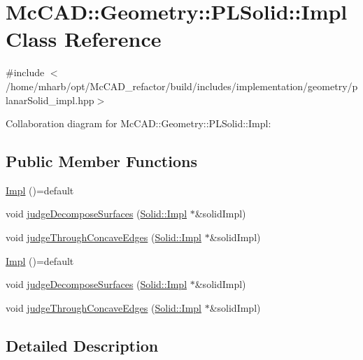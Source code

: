 \hypertarget{classMcCAD_1_1Geometry_1_1PLSolid_1_1Impl}{}\section{Mc\+C\+AD\+:\+:Geometry\+:\+:P\+L\+Solid\+:\+:Impl Class Reference}
\label{classMcCAD_1_1Geometry_1_1PLSolid_1_1Impl}


{\ttfamily \#include $<$/home/mharb/opt/\+Mc\+C\+A\+D\+\_\+refactor/build/includes/implementation/geometry/planar\+Solid\+\_\+impl.\+hpp$>$}



Collaboration diagram for Mc\+C\+AD\+:\+:Geometry\+:\+:P\+L\+Solid\+:\+:Impl\+:
\subsection*{Public Member Functions}
\begin{DoxyCompactItemize}
\item 
\hyperlink{classMcCAD_1_1Geometry_1_1PLSolid_1_1Impl_a0c9b004bfd715f51032420323b3bc925}{Impl} ()=default
\item 
void \hyperlink{classMcCAD_1_1Geometry_1_1PLSolid_1_1Impl_ad828d9d5a2eb74f867b22f779a9d2a14}{judge\+Decompose\+Surfaces} (\hyperlink{classMcCAD_1_1Geometry_1_1Solid_1_1Impl}{Solid\+::\+Impl} $\ast$\&solid\+Impl)
\item 
void \hyperlink{classMcCAD_1_1Geometry_1_1PLSolid_1_1Impl_ae5417ef1064dfe04a3eac50198626860}{judge\+Through\+Concave\+Edges} (\hyperlink{classMcCAD_1_1Geometry_1_1Solid_1_1Impl}{Solid\+::\+Impl} $\ast$\&solid\+Impl)
\item 
\hyperlink{classMcCAD_1_1Geometry_1_1PLSolid_1_1Impl_a0c9b004bfd715f51032420323b3bc925}{Impl} ()=default
\item 
void \hyperlink{classMcCAD_1_1Geometry_1_1PLSolid_1_1Impl_ad828d9d5a2eb74f867b22f779a9d2a14}{judge\+Decompose\+Surfaces} (\hyperlink{classMcCAD_1_1Geometry_1_1Solid_1_1Impl}{Solid\+::\+Impl} $\ast$\&solid\+Impl)
\item 
void \hyperlink{classMcCAD_1_1Geometry_1_1PLSolid_1_1Impl_ae5417ef1064dfe04a3eac50198626860}{judge\+Through\+Concave\+Edges} (\hyperlink{classMcCAD_1_1Geometry_1_1Solid_1_1Impl}{Solid\+::\+Impl} $\ast$\&solid\+Impl)
\end{DoxyCompactItemize}


\subsection{Detailed Description}


